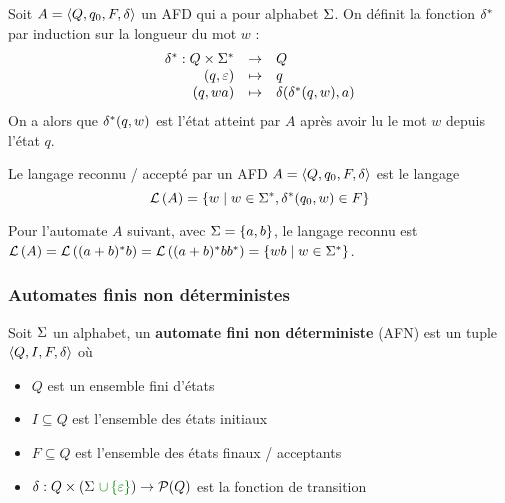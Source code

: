 \begin{definition}
	Soit $A = \langle Q, q_0, F, \delta \rangle$ un AFD qui a pour alphabet $\Sigma$. On définit la fonction $\delta^{*}$ par induction sur la longueur du mot $w$ :
	$$ \begin{array}{rcl}
			\delta^{*} : Q \times \Sigma^{*} & \to     & Q                               \\
			(q, \varepsilon)                   & \mapsto & q                               \\
			(q, wa)                         & \mapsto & \delta(\delta^{*}(q, w), a)
		\end{array} $$
	On a alors que $\delta^{*}(q, w)$ est l'état atteint par $A$ après avoir lu le mot $w$ depuis l'état $q$.
\end{definition}

\begin{definition}
	Le langage reconnu / accepté par un AFD $A = \langle Q, q_0, F, \delta \rangle$ est le langage
	$$ \mathcal{L}\left(A\right) = \left\{w \mid w \in \Sigma^{*}, \delta^{*}(q_0, w) \in F\right\} $$
\end{definition}

\begin{exemple}
	Pour l'automate $A$ suivant, avec $\Sigma = \left\{a,b\right\}$, le langage reconnu est $\mathcal{L}\left(A\right) = \mathcal{L}\left((a + b)^{*} b\right) = \mathcal{L}\left((a + b)^{*} b b^{*}\right) = \left\{wb \mid w \in \Sigma^{*}\right\}$.

	\begin{center}
	\end{center}
\end{exemple}

\subsubsection{Automates finis non déterministes }

\begin{definition}
	Soit $\Sigma$ un alphabet, un \textbf{automate fini non déterministe} (AFN) est un tuple $\langle Q, I, F, \delta \rangle$ où
	\begin{itemize}
		\item $Q$ est un ensemble fini d'états
		\item $I \subseteq Q$ est l'ensemble des états initiaux
		\item $F \subseteq Q$ est l'ensemble des états finaux / acceptants
		\item $\delta : Q \times (\alphabet \darkgreen {\ \cup \set\motvide}) \to \mathcal{P}(Q)$ est la fonction de transition
	\end{itemize}
\end{definition}


